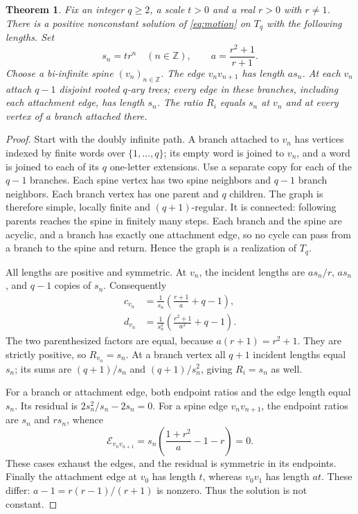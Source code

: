 \documentclass[11pt]{article}
\newtheorem{theorem}{Theorem}
\newcommand{\E}{\mathcal E}
\begin{document}
\begin{theorem}\label{thm:family}
Fix an integer $q\geq2$, a scale $t>0$ and a real $r>0$ with $r\ne1$.
There is a positive nonconstant solution of \eqref{eq:motion} on $T_q$
with the following lengths. Set
\begin{equation}\label{eq:parameters}
 s_n=t r^n\quad(n\in\mathbb Z),\qquad
 a=\frac{r^2+1}{r+1}.
\end{equation}
Choose a bi-infinite spine $(v_n)_{n\in\mathbb Z}$. The edge $v_nv_{n+1}$
has length $a s_n$. At each $v_n$ attach $q-1$ disjoint rooted
$q$-ary trees; every edge in these branches, including each attachment
edge, has length $s_n$. The ratio $R_i$ equals $s_n$ at $v_n$ and
at every vertex of a branch attached there.
\end{theorem}

\begin{proof}
Start with the doubly infinite path. A branch attached to $v_n$ has
vertices indexed by finite words over $\{1,\ldots,q\}$; its empty word
is joined to $v_n$, and a word is joined to each of its $q$ one-letter
extensions. Use a separate copy for each of the $q-1$ branches.
Each spine vertex has two spine neighbors and $q-1$ branch neighbors.
Each branch vertex has one parent and $q$ children. The graph is
therefore simple, locally finite and $(q+1)$-regular. It is connected:
following parents reaches the spine in finitely many steps. Each branch
and the spine are acyclic, and a branch has exactly one attachment edge,
so no cycle can pass from a branch to the spine and return. Hence the
graph is a realization of $T_q$.

All lengths are positive and symmetric. At $v_n$, the incident lengths
are $a s_n/r$, $a s_n$, and $q-1$ copies of $s_n$. Consequently
\begin{align}
 c_{v_n}&=\frac1{s_n}\left(\frac{r+1}{a}+q-1\right),\label{eq:c}\\
 d_{v_n}&=\frac1{s_n^2}\left(\frac{r^2+1}{a^2}+q-1\right).\label{eq:d}
\end{align}
The two parenthesized factors are equal, because
$a(r+1)=r^2+1$. They are strictly positive, so $R_{v_n}=s_n$.
At a branch vertex all $q+1$ incident lengths equal $s_n$; its sums
are $(q+1)/s_n$ and $(q+1)/s_n^2$, giving $R_i=s_n$ as well.

For a branch or attachment edge, both endpoint ratios and the edge
length equal $s_n$. Its residual is $2s_n^2/s_n-2s_n=0$.
For a spine edge $v_nv_{n+1}$, the endpoint ratios are $s_n$ and
$r s_n$, whence
\[
 \E_{v_nv_{n+1}}
 =s_n\left(\frac{1+r^2}{a}-1-r\right)=0.
\]
These cases exhaust the edges, and the residual is symmetric in its
endpoints. Finally the attachment edge at $v_0$ has length $t$,
whereas $v_0v_1$ has length $at$. These differ: $a-1=r(r-1)/(r+1)$
is nonzero. Thus the solution is not constant.
\end{proof}
\end{document}
